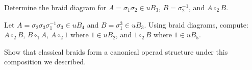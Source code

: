 \begin{Exercise}
    Determine the braid diagram for \( A = \sigma_1 \sigma_2 \in uB_3 \), \( B = \sigma_2^{-1} \), and \( A \circ_2 B \). 
\end{Exercise}
\begin{Exercise}
    Let \( A = \sigma_2 \sigma_3 \sigma_1^{-1} \sigma_3 \in uB_4 \) and \( B = \sigma_1^3 \in uB_3 \). 
    Using braid diagrams, compute: \( A \circ_2 B \), \( B \circ_1 A \), \( A \circ_2 1 \) where \( 1 \in uB_2 \), and \( 1 \circ_2 B \) where \( 1 \in uB_5 \).
\end{Exercise}
\begin{Exercise}
    Show that classical braids form a canonical operad structure under this composition we described.
\end{Exercise}